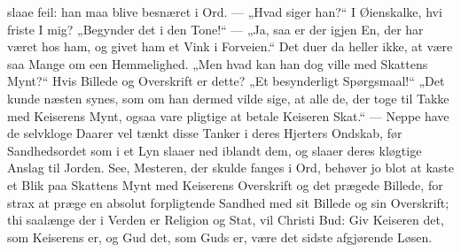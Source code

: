 \documentclass[12pt,a4paper]{book}
\begin{document}
slaae feil: han maa blive besnæret i Ord. --- „Hvad siger han?“ {\large I Øienskalke, hvi
friste I mig?} „Begynder det i den Tone!“ --- „Ja, saa er der igjen En, der har
været hos ham, og givet ham et Vink i Forveien.“ Det duer da heller ikke, at være saa Mange
om een Hemmelighed. „Men hvad kan han dog ville med Skattens Mynt?“ {\large Hvis Billede og
Overskrift er dette?} „Et besynderligt Spørgsmaal!“ „Det kunde næsten synes, som om han
dermed vilde sige, at alle de, der toge til Takke med Keiserens Mynt, ogsaa vare pligtige
at betale Keiseren Skat.“ --- Neppe have de selvkloge Daarer vel tænkt disse Tanker i deres
Hjerters Ondskab, før Sandhedsordet som i et Lyn slaaer ned iblandt dem, og slaaer deres
kløgtige Anslag til Jorden. See, Mesteren, der skulde fanges i Ord, behøver jo blot at
kaste et Blik paa Skattens Mynt med Keiserens Overskrift og det prægede Billede, for strax
at præge en absolut forpligtende Sandhed med sit Billede og sin Overskrift; thi saalænge
der i Verden er Religion og Stat, vil Christi Bud: {\large Giv Keiseren det, som Keiserens
er, og Gud det, som Guds er,} være det sidste afgjørende Løsen.
\end{document}
